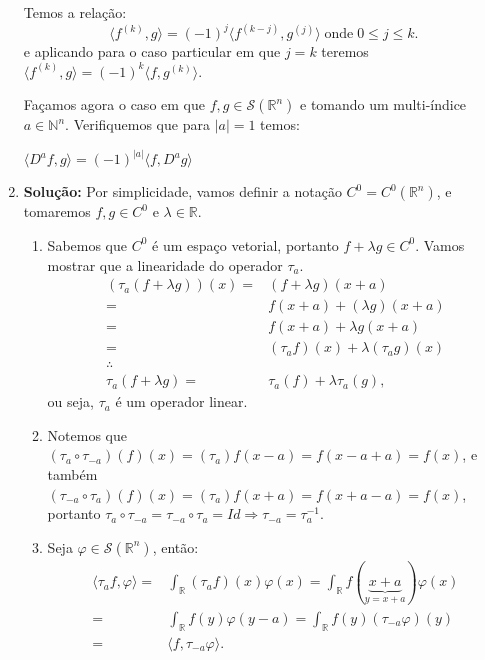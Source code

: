\documentclass{article}
\begin{document}
\begin{enumerate}
		Temos a relação: 
		$$
		\langle f^{(k)},g \rangle = (-1)^{j}\langle f^{(k-j)},g^{(j)} \rangle \; \text{onde} \; 0 \leq j \leq k.
		$$
		e aplicando para o caso particular em que $j = k$ teremos $\langle f^{(k)},g \rangle = (-1)^{k}\langle f,g^{(k)} \rangle$.
		
		Façamos agora o caso em que $f, g \in \mathcal{S}(\mathbb{R}^{n})$ e tomando um multi-índice $a \in \mathbb{N}^{n}$. Verifiquemos que para $|a| = 1$ temos:
		
		
		
		
		$\langle D^{a}f, g \rangle = (-1)^{|a|}\langle f,D^{a}g \rangle$
		
		\item \textbf{Solução:} Por simplicidade, vamos definir a notação $C^{0} = C^{0}(\mathbb{R}^{n})$, e tomaremos $f, g \in C^{0}$ e $\lambda \in \mathbb{R}$.
			\begin{enumerate}
				\item Sabemos que $C^{0}$ é um espaço vetorial, portanto $f + \lambda g \in C^{0}$. Vamos mostrar que a linearidade do operador $\tau_{a}$.
				$$
				\begin{aligned}
				(\tau_{a}(f+\lambda g))(x) = &  (f+\lambda g)(x+a) \\
				= & f(x+a) +(\lambda g)(x+a)
				\\
				= & f(x+a) +\lambda g(x+a)
				\\
				= & (\tau_{a}f)(x) +\lambda (\tau_{a}g)(x)
				\\
				\therefore &
				\\
				\tau_{a}(f+\lambda g) = & \tau_{a}(f)+\lambda \tau_{a}(g),
				\end{aligned}
				$$
				ou seja, $\tau_{a}$ é um operador linear.
				
				\item Notemos que $(\tau_{a} \circ \tau_{-a})(f)(x) = (\tau_{a})f(x-a) = f(x- a+a) = f(x)$, e também $(\tau_{-a} \circ \tau_{a})(f)(x) = (\tau_{a})f(x+a) = f(x+a-a) = f(x)$, portanto $\tau_{a} \circ \tau_{-a} = \tau_{-a} \circ \tau_{a} = Id \Rightarrow \tau_{-a} = \tau^{-1}_{a}$.
				
				\item Seja $\varphi \in \mathcal{S}(\mathbb{R}^{n})$, então:
				$$
				\begin{aligned}
				\langle \tau_{a}f, \varphi \rangle = & \int_{\mathbb{R}} (\tau_{a}f)(x)\varphi(x)
				= \int_{\mathbb{R}} f(\underbrace{ x+a }_{y = x+a}) \varphi(x)
				\\
				= & \int_{\mathbb{R}} f(y)\varphi(y-a)
				=  \int_{\mathbb{R}} f(y) (\tau_{-a}\varphi)(y) 
				\\
				= & \langle f, \tau_{-a}\varphi \rangle.
				\end{aligned}
				$$
				

\end{enumerate}
\end{enumerate}
\end{document}
